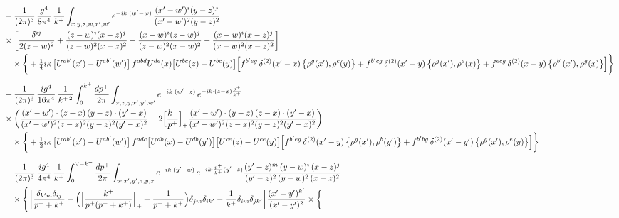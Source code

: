 \documentclass[10pt]{article}
\numberwithin{equation}{section}
\begin{document}
\begin{align}
&-\frac{1}{(2\pi)^{3}}\,\frac{g^{4}}{8\pi^{4}}\,\frac{1}{k^{+}}\int_{x,y,z,w,x^{\prime},w^{\prime}}e^{-ik\cdot(w^{\prime}-w)}\,\frac{(x^{\prime}-w^{\prime})^{i}(y-z)^{j}}{(x^{\prime}-w^{\prime})^{2}(y-z)^{2}}\notag\\
&\times\bigg[\frac{\delta^{ij}}{2(z-w)^{2}}+\frac{(z-w)^{i}(x-z)^{j}}{(z-w)^{2}(x-z)^{2}}-\frac{(x-w)^{i}(z-w)^{j}}{(z-w)^{2}(x-w)^{2}}-\frac{(x-w)^{i}(x-z)^{j}}{(x-w)^{2}(x-z)^{2}}\bigg]\notag\\
&\quad\times\bigg\{+\tfrac14 i\kappa\,\big[U^{ab^{\prime}}(x^{\prime})-U^{ab^{\prime}}(w^{\prime})\big]\,f^{abd}U^{de}(x)\big[U^{bc}(z)-U^{bc}(y)\big]\Big[f^{b^{\prime}eg}\,\delta^{(2)}(x^{\prime}-x)\,\big\{\rho^{g}(x^{\prime}),\rho^{c}(y)\big\}+f^{b^{\prime}cg}\,\delta^{(2)}(x^{\prime}-y)\,\big\{\rho^{g}(x^{\prime}),\rho^{e}(x)\big\}+f^{ecg}\,\delta^{(2)}(x-y)\,\big\{\rho^{b^{\prime}}(x^{\prime}),\rho^{g}(x)\big\}\Big]\bigg\}\notag\\[6pt]
&+\frac{1}{(2\pi)^{3}}\,\frac{ig^{4}}{16\pi^{4}}\,\frac{1}{k^{+\,2}}\int_{0}^{k^{+}}\frac{dp^{+}}{2\pi}\int_{x,z,y,x^{\prime},y^{\prime},w^{\prime}}e^{-ik\cdot(w^{\prime}-z)}\,e^{-ik\cdot(z-x)\frac{p^{+}}{k^{+}}}\notag\\
&\times\bigg(\frac{(x^{\prime}-w^{\prime})\cdot(z-x)\,(y-z)\cdot(y^{\prime}-x)}{(x^{\prime}-w^{\prime})^{2}(z-x)^{2}(y-z)^{2}(y^{\prime}-x)^{2}}-2\Big[\frac{k^{+}}{p^{+}}\Big]_{+}\frac{(x^{\prime}-w^{\prime})\cdot(y-z)\,(z-x)\cdot(y^{\prime}-x)}{(x^{\prime}-w^{\prime})^{2}(z-x)^{2}(y-z)^{2}(y^{\prime}-x)^{2}}\bigg)\notag\\
&\quad\times\bigg\{+\tfrac12 i\kappa\,\big[U^{ab^{\prime}}(x^{\prime})-U^{ab^{\prime}}(w^{\prime})\big]\,f^{adc}\big[U^{db}(x)-U^{db}(y^{\prime})\big]\big[U^{ce}(z)-U^{ce}(y)\big]\Big[f^{b^{\prime}eg}\,\delta^{(2)}(x^{\prime}-y)\,\big\{\rho^{g}(x^{\prime}),\rho^{b}(y^{\prime})\big\}+f^{b^{\prime}bg}\,\delta^{(2)}(x^{\prime}-y^{\prime})\,\big\{\rho^{g}(x^{\prime}),\rho^{e}(y)\big\}\Big]\bigg\}\notag\\[6pt]
&+\frac{1}{(2\pi)^{3}}\,\frac{ig^{4}}{4\pi^{4}}\,\frac{1}{k^{+}}\int_{0}^{\vee-k^{+}}\frac{dp^{+}}{2\pi}\int_{w,x^{\prime},y^{\prime},z,y,x}e^{-ik\cdot(y^{\prime}-w)}\,e^{-ik\cdot\frac{p^{+}}{k^{+}}(y^{\prime}-z)}\frac{(y^{\prime}-z)^{m}\,(y-w)^{i}\,(x-z)^{j}}{(y^{\prime}-z)^{2}\,(y-w)^{2}\,(x-z)^{2}}\notag\\
&\quad\times\Bigg\{\bigg[\frac{\delta_{k^{\prime}m}\delta_{ij}}{p^{+}+k^{+}}-\Big(\Big[\frac{k^{+}}{p^{+}(p^{+}+k^{+})}\Big]_{+}+\frac{1}{p^{+}+k^{+}}\Big)\delta_{jm}\delta_{ik^{\prime}}-\frac{1}{k^{+}}\delta_{im}\delta_{jk^{\prime}}\bigg]\frac{(x^{\prime}-y^{\prime})^{k^{\prime}}}{(x^{\prime}-y^{\prime})^{2}}\times\bigg\{\notag\\

\end{align}
\end{document}
